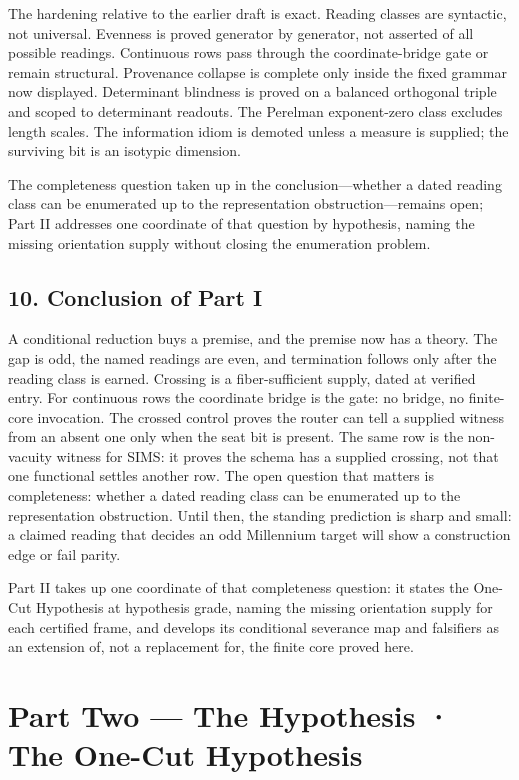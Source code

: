 \documentclass[10pt,twocolumn]{article}
\begin{document}
The hardening relative to the earlier draft is exact. Reading classes
are syntactic, not universal. Evenness is proved generator by generator,
not asserted of all possible readings. Continuous rows pass through the
coordinate-bridge gate or remain structural. Provenance collapse is
complete only inside the fixed grammar now displayed. Determinant
blindness is proved on a balanced orthogonal triple and scoped to
determinant readouts. The Perelman exponent-zero class excludes length
scales. The information idiom is demoted unless a measure is supplied;
the surviving bit is an isotypic dimension.

The completeness question taken up in the conclusion---whether a dated
reading class can be enumerated up to the representation
obstruction---remains open; Part II addresses one coordinate of that
question by hypothesis, naming the missing orientation supply without
closing the enumeration problem.

\subsection{10. Conclusion of Part I}\label{conclusion-of-part-i}

A conditional reduction buys a premise, and the premise now has a
theory. The gap is odd, the named readings are even, and termination
follows only after the reading class is earned. Crossing is a
fiber-sufficient supply, dated at verified entry. For continuous rows
the coordinate bridge is the gate: no bridge, no finite-core invocation.
The crossed control proves the router can tell a supplied witness from
an absent one only when the seat bit is present. The same row is the
non-vacuity witness for SIMS: it proves the schema has a supplied
crossing, not that one functional settles another row. The open question
that matters is completeness: whether a dated reading class can be
enumerated up to the representation obstruction. Until then, the
standing prediction is sharp and small: a claimed reading that decides
an odd Millennium target will show a construction edge or fail parity.

Part II takes up one coordinate of that completeness question: it states
the One-Cut Hypothesis at hypothesis grade, naming the missing
orientation supply for each certified frame, and develops its
conditional severance map and falsifiers as an extension of, not a
replacement for, the finite core proved here.

\section{Part Two --- The Hypothesis · The One-Cut
Hypothesis}\label{part-two-the-hypothesis-the-one-cut-hypothesis}
\end{document}
